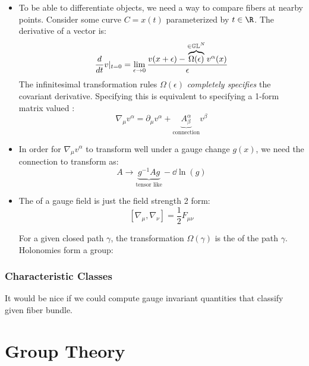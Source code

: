 \documentclass[11pt]{scrartcl}
\begin{document}
\begin{itemize}
\item To be able to differentiate objects, we need a way to compare fibers at nearby points.  Consider some curve $C = x(t)$ parameterized by $t \in \R$. The derivative of a vector is:
\[ {d \over d t} v|_{t = 0} = \lim_{\epsilon \rightarrow 0} {v(x+\epsilon) - \overbrace{\Omega(\epsilon)}^{\in \mathbb{GL}^N} v^\alpha(x) \over \epsilon} \]
The infinitesimal transformation rules $\Omega(\epsilon)$ \emph{completely specifies} the covariant derivative.  Specifying this is equivalent to specifying a 1-form matrix valued :
\[ \nabla_\mu v^\alpha = \partial_\mu v^\alpha +\underbrace{A^{\alpha}_{\beta}}_{\text{connection}} v^\beta\]

\item In order for $\nabla_\mu v^\alpha$ to transform well under a gauge change $g(x)$, we need the connection to transform as:
\[ A \rightarrow \underbrace{g^{-1} A g}_{\text{tensor like}} - \dd \ln(g) \]

\item The  of a gauge field is just the field strength 2 form:
\[  [ \nabla_\mu, \nabla_\nu ] = \frac12 F_{\mu \nu}  \]

For a given closed path $\gamma$, the transformation $\Omega(\gamma)$ is the  of the path $\gamma$.  Holonomies form a group:

\end{itemize}

\subsubsection{Characteristic Classes}

It would be nice if we could compute gauge invariant quantities that classify given fiber bundle.

\section{Group Theory}
\end{document}
